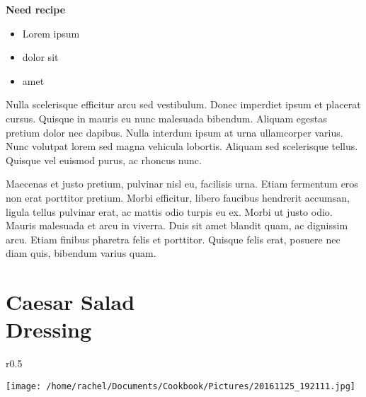\documentclass{article}
\begin{document}
\vspace{10mm}

\textbf{Need recipe}
 
\vspace{5mm}
{\selectfont 
    \begin{itemize}[noitemsep]
    
      \item[] Lorem ipsum
      \item[] dolor sit
      \item[] amet
      
    \end{itemize}
    }
\vspace{5mm}
    
Nulla scelerisque efficitur arcu sed vestibulum. Donec imperdiet ipsum et placerat cursus. Quisque in mauris eu nunc malesuada bibendum. Aliquam egestas pretium dolor nec dapibus. Nulla interdum ipsum at urna ullamcorper varius. Nunc volutpat lorem sed magna vehicula lobortis. Aliquam sed scelerisque tellus. Quisque vel euismod purus, ac rhoncus nunc.

Maecenas et justo pretium, pulvinar nisl eu, facilisis urna. Etiam fermentum eros non erat porttitor pretium. Morbi efficitur, libero faucibus hendrerit accumsan, ligula tellus pulvinar erat, ac mattis odio turpis eu ex. Morbi ut justo odio. Mauris malesuada et arcu in viverra. Duis sit amet blandit quam, ac dignissim arcu. Etiam finibus pharetra felis et porttitor. Quisque felis erat, posuere nec diam quis, bibendum varius quam.

\restoregeometry










\section*{\fontsize{25}{15}\selectfont Caesar Salad \\Dressing}



\begin{wrapfigure}{r}{0.5\textwidth}
\
  \begin{center}
 	\hfill\begin{minipage}{\textwidth}\centering
 	\vspace*{-6cm}
		\texttt{[image: /home/rachel/Documents/Cookbook/Pictures/20161125\_192111.jpg]}
	\end{minipage}  
	\end{center}

\end{wrapfigure}
\end{document}
